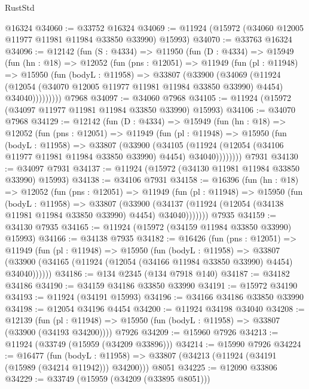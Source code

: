 \begin{lexlean}{RustStd}
\begin{coremodule}
    @16324
@34060 := @33752 @16324
@34069 := @11924 (@15972 (@34060 @12005 @11977 @11981 @11984 @33850 @33990) @15993)
@34070 := @33763 @16324
@34096 := @12142
    (fun (S : @4334) =>
    @11950
      (fun (D : @4334) =>
      @15949
        (fun (hn : @18) =>
        @12052
          (fun (pns : @12051) =>
          @11949
            (fun (pl : @11948) =>
            @15950
              (fun (bodyL : @11958) =>
              @33807
                (@33900
                  (@34069
                    (@11924
                      (@12054 (@34070 @12005 @11977 @11981 @11984 @33850 @33990) @4454)
                      @34040)))))))))
    @7968
@34097 := @34060 @7968
@34105 := @11924 (@15972 (@34097 @11977 @11981 @11984 @33850 @33990) @15993)
@34106 := @34070 @7968
@34129 := @12142
    (fun (D : @4334) =>
    @15949
      (fun (hn : @18) =>
      @12052
        (fun (pns : @12051) =>
        @11949
          (fun (pl : @11948) =>
          @15950
            (fun (bodyL : @11958) =>
            @33807
              (@33900
                (@34105
                  (@11924 (@12054 (@34106 @11977 @11981 @11984 @33850 @33990) @4454) @34040))))))))
    @7931
@34130 := @34097 @7931
@34137 := @11924 (@15972 (@34130 @11981 @11984 @33850 @33990) @15993)
@34138 := @34106 @7931
@34158 := @16396
    (fun (hn : @18) =>
    @12052
      (fun (pns : @12051) =>
      @11949
        (fun (pl : @11948) =>
        @15950
          (fun (bodyL : @11958) =>
          @33807
            (@33900
              (@34137 (@11924 (@12054 (@34138 @11981 @11984 @33850 @33990) @4454) @34040)))))))
    @7935
@34159 := @34130 @7935
@34165 := @11924 (@15972 (@34159 @11984 @33850 @33990) @15993)
@34166 := @34138 @7935
@34182 := @16426
    (fun (pns : @12051) =>
    @11949
      (fun (pl : @11948) =>
      @15950
        (fun (bodyL : @11958) =>
        @33807 (@33900 (@34165 (@11924 (@12054 (@34166 @11984 @33850 @33990) @4454) @34040))))))
@34186 := @134 @2345 (@134 @7918 @140)
@34187 := @34182 @34186
@34190 := @34159 @34186 @33850 @33990
@34191 := @15972 @34190
@34193 := @11924 (@34191 @15993)
@34196 := @34166 @34186 @33850 @33990
@34198 := @12054 @34196 @4454
@34200 := @11924 @34198 @34040
@34208 := @12139
    (fun (pl : @11948) => @15950 (fun (bodyL : @11958) => @33807 (@33900 (@34193 @34200))))
    @7926
@34209 := @15960 @7926
@34213 := @11924 (@33749 (@15959 (@34209 @33896)))
@34214 := @15990 @7926
@34224 := @16477
    (fun (bodyL : @11958) => @33807 (@34213 (@11924 (@34191 (@15989 (@34214 @11942))) @34200)))
    @8051
@34225 := @12090 @33806
@34229 := @33749 (@15959 (@34209 (@33895 @8051)))

\end{coremodule}
\end{lexlean}

